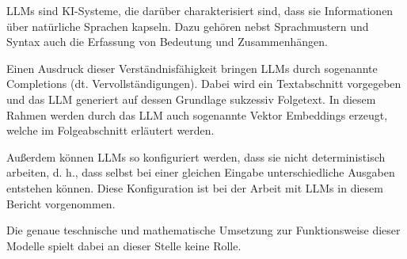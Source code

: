 \documentclass[../main.tex]{subfiles}
\begin{document}
\glspl{LLM} sind KI-Systeme, die darüber charakterisiert sind, dass sie Informationen über natürliche Sprachen kapseln.
Dazu gehören nebst Sprachmustern und Syntax auch die Erfassung von Bedeutung und Zusammenhängen.
\cite{zheng2023large}

Einen Ausdruck dieser Verständnisfähigkeit bringen \glspl{LLM} durch sogenannte Completions (dt. Vervollständigungen).
Dabei wird ein Textabschnitt vorgegeben und das \gls{LLM} generiert auf dessen Grundlage sukzessiv Folgetext.
In diesem Rahmen werden durch das \gls{LLM} auch sogenannte Vektor Embeddings erzeugt, welche im Folgeabschnitt erläutert werden.
\cite{naveed2023comprehensive}

Außerdem können \glspl{LLM} so konfiguriert werden, dass sie nicht deterministisch arbeiten, d. h., dass selbst bei einer gleichen Eingabe unterschiedliche Ausgaben entstehen können.
Diese Konfiguration ist bei der Arbeit mit \glspl{LLM} in diesem Bericht vorgenommen.

Die genaue teschnische und mathematische Umsetzung zur Funktionsweise dieser Modelle spielt dabei an dieser Stelle keine Rolle.
\end{document}
